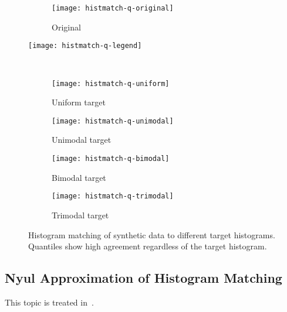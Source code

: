 \begin{figure}
  \centering
  \begin{subfigure}{\plotwidth}
    \texttt{[image: histmatch-q-original]}
    \caption{Original}
  \end{subfigure}
  \parbox[c]{\plotwidth}{\texttt{[image: histmatch-q-legend]}}\\
  \begin{subfigure}{\plotwidth}
    \texttt{[image: histmatch-q-uniform]}
    \caption{Uniform target}
  \end{subfigure}
  \begin{subfigure}{\plotwidth}
    \texttt{[image: histmatch-q-unimodal]}
    \caption{Unimodal target}
  \end{subfigure}
  \begin{subfigure}{\plotwidth}
    \texttt{[image: histmatch-q-bimodal]}
    \caption{Bimodal target}
  \end{subfigure}
  \begin{subfigure}{\plotwidth}
    \texttt{[image: histmatch-q-trimodal]}
    \caption{Trimodal target}
  \end{subfigure}
  \caption{Histogram matching of synthetic data to different target histograms.
    Quantiles show high agreement regardless of the target histogram.}%
  \label{fig:hm-vs-he}
\end{figure}
\subsection{Nyul Approximation of Histogram Matching}\label{ss:nyul-approx}
This topic is treated in~\cite{Knight2017}.
